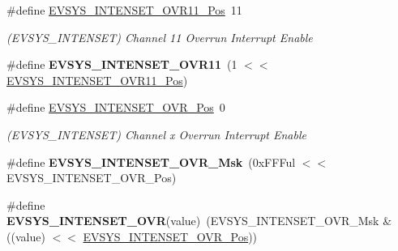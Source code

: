 \begin{DoxyCompactItemize}
\item 
\hypertarget{group___s_a_m_l21___e_v_s_y_s_gae3f777daa6b0cbcb4b5fbe9063edb74d}{}\#define \hyperlink{group___s_a_m_l21___e_v_s_y_s_gae3f777daa6b0cbcb4b5fbe9063edb74d}{E\+V\+S\+Y\+S\+\_\+\+I\+N\+T\+E\+N\+S\+E\+T\+\_\+\+O\+V\+R11\+\_\+\+Pos}~11\label{group___s_a_m_l21___e_v_s_y_s_gae3f777daa6b0cbcb4b5fbe9063edb74d}

\begin{DoxyCompactList}\small\item\em (E\+V\+S\+Y\+S\+\_\+\+I\+N\+T\+E\+N\+S\+E\+T) Channel 11 Overrun Interrupt Enable \end{DoxyCompactList}\item 
\hypertarget{group___s_a_m_l21___e_v_s_y_s_ga784e17fe28b10bf86085646ed9733678}{}\#define {\bfseries E\+V\+S\+Y\+S\+\_\+\+I\+N\+T\+E\+N\+S\+E\+T\+\_\+\+O\+V\+R11}~(1 $<$$<$ \hyperlink{group___s_a_m_l21___e_v_s_y_s_gae3f777daa6b0cbcb4b5fbe9063edb74d}{E\+V\+S\+Y\+S\+\_\+\+I\+N\+T\+E\+N\+S\+E\+T\+\_\+\+O\+V\+R11\+\_\+\+Pos})\label{group___s_a_m_l21___e_v_s_y_s_ga784e17fe28b10bf86085646ed9733678}

\item 
\hypertarget{group___s_a_m_l21___e_v_s_y_s_ga87a2da8753cbf8b7545463efe086c151}{}\#define \hyperlink{group___s_a_m_l21___e_v_s_y_s_ga87a2da8753cbf8b7545463efe086c151}{E\+V\+S\+Y\+S\+\_\+\+I\+N\+T\+E\+N\+S\+E\+T\+\_\+\+O\+V\+R\+\_\+\+Pos}~0\label{group___s_a_m_l21___e_v_s_y_s_ga87a2da8753cbf8b7545463efe086c151}

\begin{DoxyCompactList}\small\item\em (E\+V\+S\+Y\+S\+\_\+\+I\+N\+T\+E\+N\+S\+E\+T) Channel x Overrun Interrupt Enable \end{DoxyCompactList}\item 
\hypertarget{group___s_a_m_l21___e_v_s_y_s_gafd9341f5c3e530d9af9966a0cf3b45cc}{}\#define {\bfseries E\+V\+S\+Y\+S\+\_\+\+I\+N\+T\+E\+N\+S\+E\+T\+\_\+\+O\+V\+R\+\_\+\+Msk}~(0x\+F\+F\+Ful $<$$<$ E\+V\+S\+Y\+S\+\_\+\+I\+N\+T\+E\+N\+S\+E\+T\+\_\+\+O\+V\+R\+\_\+\+Pos)\label{group___s_a_m_l21___e_v_s_y_s_gafd9341f5c3e530d9af9966a0cf3b45cc}

\item 
\hypertarget{group___s_a_m_l21___e_v_s_y_s_gaa6612d679314c8fcf41fb3a7f793031d}{}\#define {\bfseries E\+V\+S\+Y\+S\+\_\+\+I\+N\+T\+E\+N\+S\+E\+T\+\_\+\+O\+V\+R}(value)~(E\+V\+S\+Y\+S\+\_\+\+I\+N\+T\+E\+N\+S\+E\+T\+\_\+\+O\+V\+R\+\_\+\+Msk \& ((value) $<$$<$ \hyperlink{group___s_a_m_l21___e_v_s_y_s_ga87a2da8753cbf8b7545463efe086c151}{E\+V\+S\+Y\+S\+\_\+\+I\+N\+T\+E\+N\+S\+E\+T\+\_\+\+O\+V\+R\+\_\+\+Pos}))\label{group___s_a_m_l21___e_v_s_y_s_gaa6612d679314c8fcf41fb3a7f793031d}


\end{DoxyCompactItemize}
